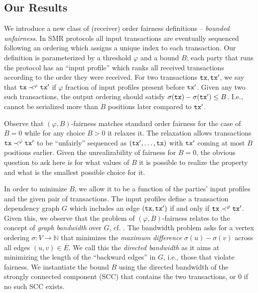 \subsection{Our Results}
\label{subsec:our-results}

We introduce a new class of (receiver) order fairness definitions -- \emph{bounded unfairness}.
%
In SMR protocols all input transactions are eventually sequenced following an ordering \orderOutput which assigns a unique index to each transaction.
%
Our definition is parameterized by a threshold $\varphi$ and a bound $B$; each party that runs the protocol has an ``input profile'' which ranks all received transactions according to the order they were received.
%
For two transactions $\mathtt{tx}, \mathtt{tx}'$, we say that $\mathtt{tx} \prec^\varphi \mathtt{tx}'$ if $\varphi$ fraction of input profiles present \tx before $\mathtt{tx}'$.
%
Given any two such transactions, the output ordering \orderOutput should satisfy
$\sigma(\mathtt{tx}) - \sigma(\mathtt{tx}') \leq B$.
%
I.e., \tx cannot be serialized more than $B$ positions later compared to $\mathtt{tx}'$.

Observe that $(\varphi, B)$-fairness matches standard order fairness for the case of $B = 0$ while for any choice $B > 0$ it relaxes it.
%
The relaxation allows transactions $\mathtt{tx} \prec^\varphi \mathtt{tx}'$ to be ``unfairly'' sequenced as $(\mathtt{tx}', \ldots, \mathtt{tx})$ with $\mathtt{tx}'$ coming at most $B$ positions earlier.
%
Given the unrealizability of fairness for $B = 0$, the obvious question to ask here is for what values of $B$ it is possible to realize the property and what is the smallest possible choice for it.

In order to minimize $B$, we allow it to be a function of the parties' input profiles and the given pair of transactions.
%
The input profiles define a transaction dependency graph $G$ which includes an edge $(\mathtt{tx}, \mathtt{tx}')$  if and only if $\mathtt{tx} \prec^\varphi \mathtt{tx}'$. Given this, we observe that the problem of $(\varphi, B)$-fairness relates to the concept of \emph{graph bandwidth} over $G$, cf. \cite{FSTTCS:JKLSS19}.
%
The bandwidth problem asks for a vertex ordering $\sigma: V \rightarrow \mathbb{N}$ that minimizes the \emph{maximum difference} $\sigma(u) - \sigma(v)$ across all edges $(u,v) \in E$.
%
We call this the \emph{directed bandwidth} as it aims at minimizing the length of the ``backward edges'' in $G$, i.e., those that violate fairness.
%
We instantiate  the bound $B$ using the directed bandwidth of the strongly connected component (SCC) that contains the two transactions, or 0 if no such SCC exists.

